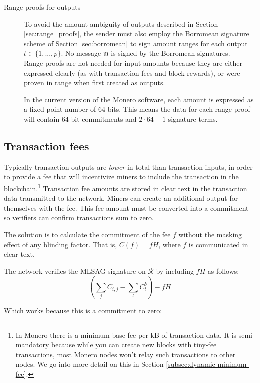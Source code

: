 \begin{description}
	\item[Range proofs for outputs]
	To avoid the amount ambiguity of outputs described in Section  \ref{sec:range_proofs}, the sender must also employ the Borromean signature scheme of Section \ref{sec:borromean} to sign amount ranges for each output $t \in \{1, ..., p\}$. No message $\mathfrak{m}$ is signed by the Borromean signatures.\\
	
	Range proofs are not needed for input amounts because they are either expressed clearly (as with transaction fees and block rewards), or were proven in range when first created as outputs.
	
	In the current version of the Monero software, each amount is expressed as a fixed point number of 64 bits. This means the data for each range proof will contain 64 bit commitments and $2 \cdot 64 + 1$ signature terms.
	
\end{description}


\subsection{Transaction fees}

Typically transaction outputs are {\em lower} in total than transaction inputs, in order to provide a fee that will incentivize miners to include the transaction in the blockchain.\footnote{In Monero there is a minimum base fee per kB of transaction data. It is semi-mandatory because while you can create new blocks with tiny-fee transactions, most Monero nodes won't relay such transactions to other nodes. We go into more detail on this in Section \ref{subsec:dynamic-minimum-fee}.} Transaction fee amounts are stored in clear text in the transaction data transmitted to the network. Miners can create an additional output for themselves with the fee. This fee amount must be converted into a commitment so verifiers can confirm transactions sum to zero.

The solution is to calculate the commitment of the fee $f$ without the masking effect of any blinding factor. That is, $C(f) = f H$, where $f$ is communicated in clear text.

The network verifies the MLSAG signature on $\mathcal{R}$ by including $f H$ as follows:\\
\[ (\sum\limits_j C_{i, j} - \sum\limits_t C^b_{t}) - f H\]

Which works because this is a commitment to zero:

